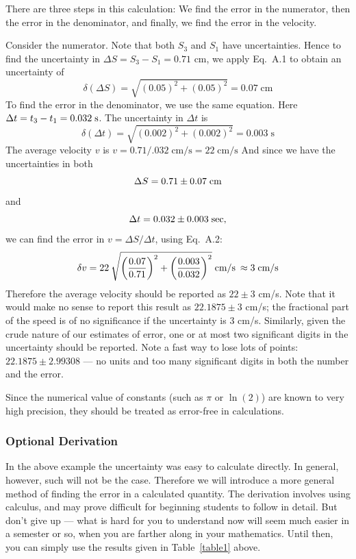 There are three steps in this calculation:  We find the error in the
numerator, then the error in the denominator, and finally, we find
the error in the velocity.

Consider the numerator.  Note that both $S_3$ and $S_1$ have
uncertainties.  Hence to find the uncertainty in
$ \Delta S = S_{3} - S_{1} = 0.71$ cm, we apply Eq.~A.1 to obtain an
uncertainty of
\[
\delta (\Delta S) = \sqrt{ (0.05)^{2} + (0.05)^{2} } = 0.07 \;
\mbox{cm} \]
To find the error in the denominator, we use the same equation.
Here $\Delta t = t_{3} - t_{1} = 0.032 \; \rm{s}$.  The uncertainty
in $\Delta t$ is
\[
\delta (\Delta t) = \sqrt{ (0.002)^{2} + (0.002)^{2} } = 0.003 \;
\mbox{s}
\]
The average velocity $v$ is
$v = 0.71/.032 \; \mbox{cm/s} = 22 \; \mbox{cm/s}$
And since we have the uncertainties in both
\[
\Delta S = 0.71 \pm 0.07 \; \rm{cm}
\]
and
\[
 \Delta t = 0.032 \pm 0.003 \; \rm{sec},
\]
we can find the error in $v = \Delta S / \Delta t$, using Eq.~A.2:
\[
\delta v = 22 \: \sqrt{ \left({{0.07} \over {0.71}}\right)^{2} +
           \left({{0.003} \over {0.032}}\right)^{2} } \; \mbox{cm/s} \:
         \approx 3 \; \mbox{cm/s}
\]
 Therefore the average velocity should be reported as $22 \pm 3$ cm/s.
Note that it would make no sense to report this result as $ 22.1875\pm 3$ cm/s;
the fractional part of the speed is of no significance if the uncertainty  is 3 cm/s.
Similarly, given the crude nature of our estimates of error, one or at most
two significant digits in the uncertainty should be reported.  
Note a fast way to lose lots of points: $ 22.1875\pm 2.99308$ --- no units and 
too many significant digits in both the number and the error.\label{appa:sigfigs}

Since the numerical value of  constants (such as
$\pi$ or $\ln(2)$) are known to very high precision, they should
be treated as error-free in calculations.  


\subsubsection*{Optional Derivation}
     In the above example the uncertainty was easy to calculate
directly.  In general, however, such will not be the case.
Therefore we will introduce a more general method of finding the
error in a calculated quantity.  The derivation involves using
calculus, and may prove difficult for beginning students to
follow in detail.  But don't give up --- what is hard for you to
understand now will seem much easier in a semester or so, when
you are farther along in your mathematics.  Until then, you can
simply use the results given in Table~\ref{table1} above.

